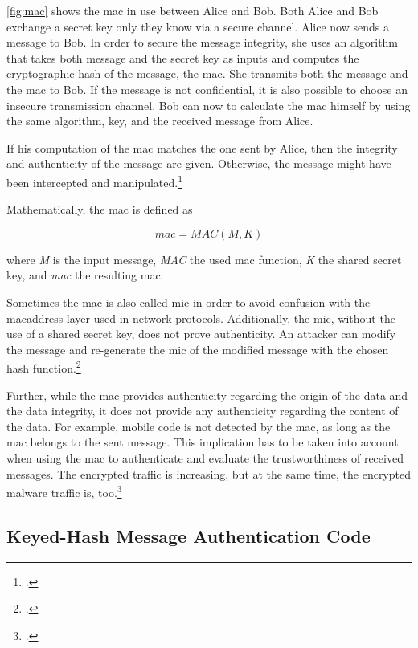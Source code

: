 \autoref{fig:mac} shows the \gls{mac} in use between Alice and Bob. Both Alice and Bob exchange a secret key only they know via a secure channel. Alice now sends a message to Bob. In order to secure the message integrity, she uses an algorithm that takes both message and the secret key as inputs and computes the cryptographic hash of the message, the \gls{mac}. She transmits both the message and the \gls{mac} to Bob. If the message is not confidential, it is also possible to choose an insecure transmission channel. Bob can now to calculate the \gls{mac} himself by using the same algorithm, key, and the received message from Alice.

If his computation of the \gls{mac} matches the one sent by Alice, then the integrity and authenticity of the message are given. Otherwise, the message might have been intercepted and manipulated.\footcites[See][320]{Paar2010}

Mathematically, the \gls{mac} is defined as

\begin{equation*}
	mac = MAC(M, K)
\end{equation*}

where \textit{M} is the input message, \textit{MAC} the used \gls{mac} function, \textit{K} the shared secret key, and \textit{mac} the resulting \glsdesc{mac}.

Sometimes the \gls{mac} is also called \gls{mic} in order to avoid confusion with the \gls{macaddress} layer used in network protocols. Additionally, the \gls{mic}, without the use of a shared secret key, does not prove authenticity. An attacker can modify the message and re-generate the \gls{mic} of the modified message with the chosen hash function.\footcites[See][60--62]{265831}

Further, while the \gls{mac} provides authenticity regarding the origin of the data and the data integrity, it does not provide any authenticity regarding the content of the data. For example, mobile code is not detected by the \gls{mac}, as long as the \gls{mac} belongs to the sent message. This implication has to be taken into account when using the \gls{mac} to authenticate and evaluate the trustworthiness of received messages. The encrypted traffic is increasing, but at the same time, the encrypted malware traffic is, too.\footcites[See][100]{weldon2015}

\subsection{Keyed-Hash Message Authentication Code}

